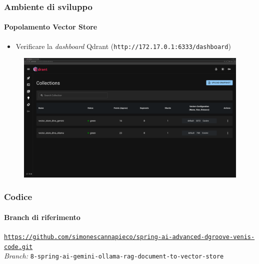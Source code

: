 %
\begin{frame}[t,fragile] \frametitle{Ambiente di sviluppo}
\framesubtitle{Popolamento Vector Store}
	\vspace*{-.5cm}
    {\footnotesize
    \begin{itemize}
        \item[\alert{\faExclamationTriangle}] Verificare la \textit{dashboard} Qdrant (\texttt{http://172.17.0.1:6333/dashboard})
    \end{itemize}
    }
    \vfill
    \begin{minipage}[b]{\textwidth}
		\centering
		    \begin{figure}[ht]
			    \includegraphics[width=\textwidth, frame]{img/qdrant-dashboard.png}
		    \end{figure}
	\end{minipage}
\end{frame}
%
\begin{frame}[fragile] \frametitle{Codice}
    \framesubtitle{Branch di riferimento}
	\begin{center}
		{\scriptsize \href{https://github.com/simonescannapieco/spring-ai-advanced-dgroove-venis-code.git}{\texttt{https://github.com/simonescannapieco/spring-ai-advanced-dgroove-venis-code.git}}}\\
		\textit{Branch:} \alert{\texttt{8-spring-ai-gemini-ollama-rag-document-to-vector-store}}
	\end{center}
\end{frame}